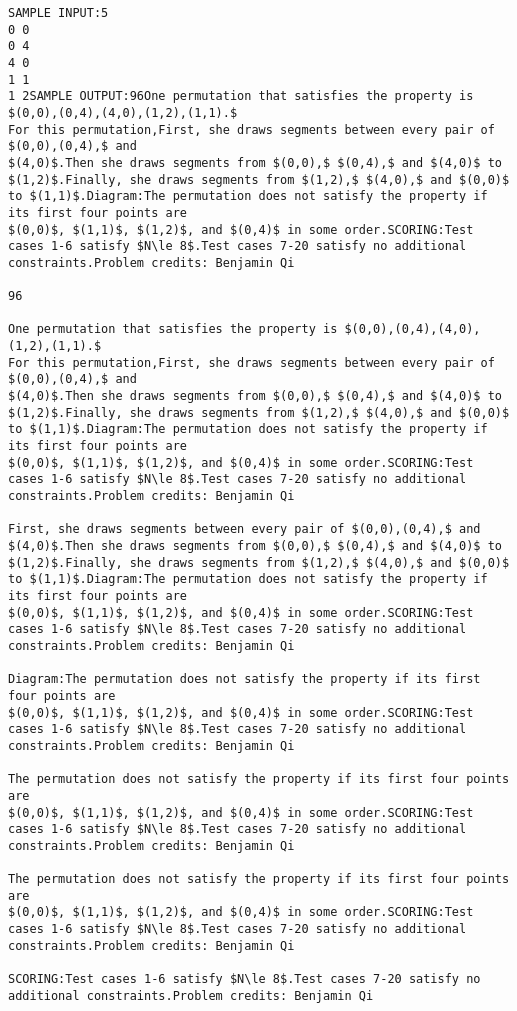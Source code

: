 \documentclass[12pt]{article}
\begin{document}
\begin{verbatim}
SAMPLE INPUT:5
0 0
0 4
4 0
1 1
1 2SAMPLE OUTPUT:96One permutation that satisfies the property is $(0,0),(0,4),(4,0),(1,2),(1,1).$
For this permutation,First, she draws segments between every pair of $(0,0),(0,4),$ and
$(4,0)$.Then she draws segments from $(0,0),$ $(0,4),$ and $(4,0)$ to $(1,2)$.Finally, she draws segments from $(1,2),$ $(4,0),$ and $(0,0)$ to $(1,1)$.Diagram:The permutation does not satisfy the property if its first four points are
$(0,0)$, $(1,1)$, $(1,2)$, and $(0,4)$ in some order.SCORING:Test cases 1-6 satisfy $N\le 8$.Test cases 7-20 satisfy no additional constraints.Problem credits: Benjamin Qi

96

One permutation that satisfies the property is $(0,0),(0,4),(4,0),(1,2),(1,1).$
For this permutation,First, she draws segments between every pair of $(0,0),(0,4),$ and
$(4,0)$.Then she draws segments from $(0,0),$ $(0,4),$ and $(4,0)$ to $(1,2)$.Finally, she draws segments from $(1,2),$ $(4,0),$ and $(0,0)$ to $(1,1)$.Diagram:The permutation does not satisfy the property if its first four points are
$(0,0)$, $(1,1)$, $(1,2)$, and $(0,4)$ in some order.SCORING:Test cases 1-6 satisfy $N\le 8$.Test cases 7-20 satisfy no additional constraints.Problem credits: Benjamin Qi

First, she draws segments between every pair of $(0,0),(0,4),$ and
$(4,0)$.Then she draws segments from $(0,0),$ $(0,4),$ and $(4,0)$ to $(1,2)$.Finally, she draws segments from $(1,2),$ $(4,0),$ and $(0,0)$ to $(1,1)$.Diagram:The permutation does not satisfy the property if its first four points are
$(0,0)$, $(1,1)$, $(1,2)$, and $(0,4)$ in some order.SCORING:Test cases 1-6 satisfy $N\le 8$.Test cases 7-20 satisfy no additional constraints.Problem credits: Benjamin Qi

Diagram:The permutation does not satisfy the property if its first four points are
$(0,0)$, $(1,1)$, $(1,2)$, and $(0,4)$ in some order.SCORING:Test cases 1-6 satisfy $N\le 8$.Test cases 7-20 satisfy no additional constraints.Problem credits: Benjamin Qi

The permutation does not satisfy the property if its first four points are
$(0,0)$, $(1,1)$, $(1,2)$, and $(0,4)$ in some order.SCORING:Test cases 1-6 satisfy $N\le 8$.Test cases 7-20 satisfy no additional constraints.Problem credits: Benjamin Qi

The permutation does not satisfy the property if its first four points are
$(0,0)$, $(1,1)$, $(1,2)$, and $(0,4)$ in some order.SCORING:Test cases 1-6 satisfy $N\le 8$.Test cases 7-20 satisfy no additional constraints.Problem credits: Benjamin Qi

SCORING:Test cases 1-6 satisfy $N\le 8$.Test cases 7-20 satisfy no additional constraints.Problem credits: Benjamin Qi
\end{verbatim}
\end{document}
